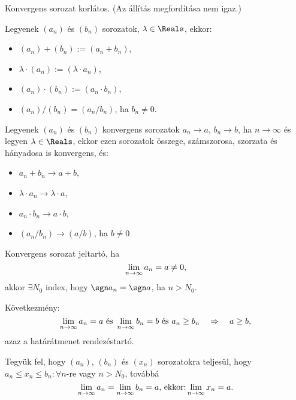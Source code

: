 \begin{note}
  Konvergens sorozat korlátos. (Az állítás megfordítása nem igaz.)
\end{note}

\vspace{-.5em}
\begin{definition}
  Legyenek $(a_n)$ és $(b_n)$ sorozatok, $\lambda \in \Reals$, ekkor:
  \begin{itemize}
    \item $(a_n) + (b_n) := (a_n + b_n)$,
    \item $\lambda \cdot (a_n) := (\lambda \cdot a_n)$,
    \item $(a_n)\cdot (b_n):=(a_n\cdot b_n)$,
    \item $(a_n) / (b_n) = (a_n / b_n)$, ha $b_n \neq 0$.
  \end{itemize}
\end{definition}

\begin{note}
  Legyenek $(a_n)$ és $(b_n)$ konvergens sorozatok $a_n \rightarrow a$,
  $b_n \rightarrow b$, ha $n \rightarrow \infty $ és legyen ${\lambda \in
      \Reals}$, ekkor ezen sorozatok összege, számszorosa, szorzata és
  hányadosa is konvergens, és:
  \begin{itemize}
    \item $a_n + b_n \rightarrow{a + b}$,
    \item $\lambda \cdot a_n \rightarrow \lambda \cdot a$,
    \item $a_n \cdot b_n\rightarrow a \cdot b$,
    \item $(a_n / b_n) \rightarrow (a / b)$, ha $b \neq 0$
  \end{itemize}
\end{note}

\begin{note}
  Konvergens sorozat jeltartó, ha
  \[
    \lim_{n \rightarrow\infty} a_n=a\neq 0
    \text,
  \]
  akkor $\exists N_0$ index, hogy $\sgn a_n = \sgn a $, ha $n > N_0$.

  Következmény:
  \[
    \lim_{n \rightarrow \infty} a_n = a
    \text{ és }
    \lim_{n \rightarrow \infty} b_n = b
    \text{ és }
    a_n \geq b_n
    \quad \Rightarrow \quad
    a \geq b
    \text,
  \]
  azaz a határátmenet rendezéstartó.
\end{note}

\begin{theorem}
  Tegyük fel, hogy $(a_n)$, $(b_n)$ és $(x_n)$ sorozatokra teljesül, hogy $a_n
    \leq x_n \leq b_n : \forall n$-re vagy $n > N_0$, továbbá
  \[
    \lim_{n \rightarrow \infty} a_n = \lim_{n \rightarrow \infty} b_n = a
    \text{, ekkor:}
    \lim_{n \rightarrow \infty} x_n = a
    \text.
  \]

\end{theorem}

